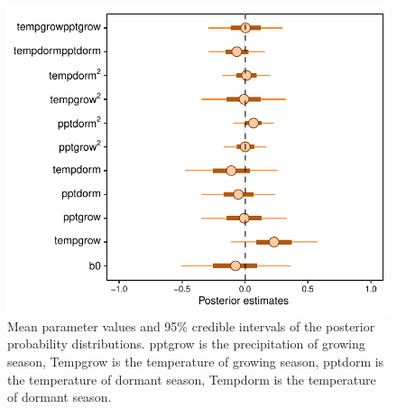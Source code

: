 \documentclass[12pt]{article}\usepackage[]{graphicx}\usepackage[dvipsnames]{xcolor}
\begin{document}
\begin{figure}[H]
	\centering
	\includegraphics[width=0.75\linewidth]{Figures/Posterior_SR.pdf}
	\caption{Mean parameter values and 95\% credible intervals of the posterior probability distributions. 
		pptgrow is  the precipitation of growing season,
		Tempgrow is the temperature of growing season,
		pptdorm is the temperature of dormant season,
		Tempdorm is the temperature of dormant season.}
	\label{Sup:PosteriorSR}
\end{figure}

\end{document}
